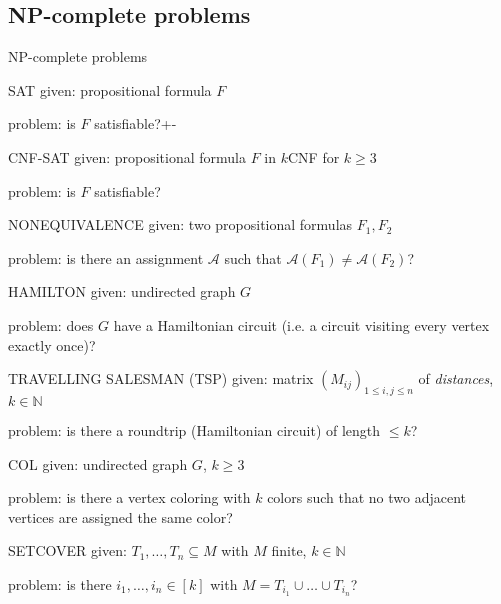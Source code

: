 \documentclass{beamer}
\theoremstyle{definition}
\begin{document}
\subsection{NP-complete problems}

\begin{frame}[allowframebreaks]{NP-complete problems}

\begin{block}{SAT}
given: propositional formula $F$\par
problem: is $F$ satisfiable?+-
\end{block}

\begin{block}{CNF-SAT}
given: propositional formula $F$ in $k$CNF for $k \geq 3$\par
problem: is $F$ satisfiable?
\end{block}

\begin{block}{NONEQUIVALENCE}
given: two propositional formulas $F_1, F_2$\par
problem: is there an assignment $\mathcal{A}$ such that $\mathcal{A}(F_1) \neq \mathcal{A}(F_2)$?
\end{block}

\framebreak

\begin{block}{HAMILTON}
given: undirected graph $G$\par
problem: does $G$ have a Hamiltonian circuit (i.e. a circuit visiting every vertex exactly once)?
\end{block}

\begin{block}{TRAVELLING SALESMAN (TSP)}
given: matrix $(M_{ij})_{1\leq i,j \leq n}$ of \textit{distances}, $k \in \mathbb{N}$\par
problem: is there a roundtrip (Hamiltonian circuit) of length $\leq k$?
\end{block}

\framebreak

\begin{block}{COL}
given: undirected graph $G$, $k \geq 3$\par
problem: is there a vertex coloring with $k$ colors such that no two adjacent vertices are assigned the same color?
\end{block}

\begin{block}{SETCOVER}
given: $T_1,\ldots,T_n \subseteq M$ with $M$ finite, $k \in \mathbb{N}$\par
problem: is there $i_1,\ldots,i_n \in [k]$ with $M = T_{i_1} \cup \dots \cup T_{i_n}$?
\end{block}


\end{frame}
\end{document}
